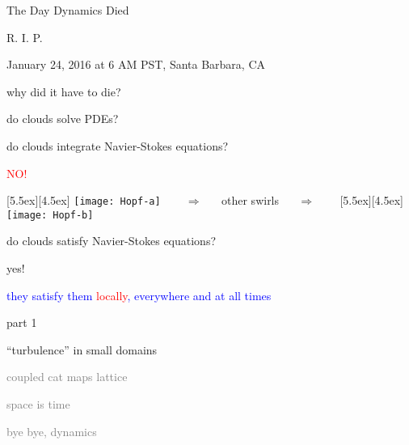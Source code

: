 \begin{frame}{The Day Dynamics Died}

\begin{block}{}
\centerline{\Huge R. I. P.}

\bigskip

\centerline{January 24, 2016 at 6 AM PST, Santa Barbara, CA}
\end{block}


\vfill\hfill why did it have to die?
\end{frame}

\begin{frame}{do clouds solve PDEs?}

do clouds integrate Navier-Stokes equations?

\begin{center}
\centerline{\textcolor{red}{\Huge NO!}}

\begin{minipage}[t]{\textwidth}
	\begin{center}
\centerline{
\raisebox{-4.0ex}[5.5ex][4.5ex]
		 {\texttt{[image: Hopf-a]}}
~~~ $\Longrightarrow$ ~~ {other swirls} ~~ $\Longrightarrow$ ~~~
	\raisebox{-4.0ex}[5.5ex][4.5ex]
		 {\texttt{[image: Hopf-b]}}
          }
	\end{center}
\end{minipage}
\end{center}

do clouds satisfy Navier-Stokes equations?

\bigskip

{\Large yes!}

\centerline{
\textcolor{blue}{they satisfy them \textcolor{red}{\large locally}, everywhere and at all times}
}
\end{frame}

\begin{frame}{part 1}
\begin{enumerate}
              \item {\Large
``turbulence'' in small domains
                  }\textcolor{gray}{\small
              \item
coupled cat maps lattice
              \item
space is time
              \item
bye bye, dynamics
                    }
            \end{enumerate}
\end{frame}


